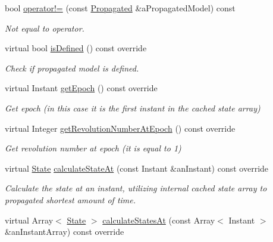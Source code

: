 \begin{DoxyCompactItemize}
bool \hyperlink{classostk_1_1astro_1_1trajectory_1_1orbit_1_1models_1_1_propagated_a71c17288a6039ddcc1a5d3e5e62e1f35}{operator!=} (const \hyperlink{classostk_1_1astro_1_1trajectory_1_1orbit_1_1models_1_1_propagated}{Propagated} \&a\+Propagated\+Model) const
\begin{DoxyCompactList}\small\item\em Not equal to operator. \end{DoxyCompactList}\item 
virtual bool \hyperlink{classostk_1_1astro_1_1trajectory_1_1orbit_1_1models_1_1_propagated_a530fd6bc017c74dedc43ced5fe843a03}{is\+Defined} () const override
\begin{DoxyCompactList}\small\item\em Check if propagated model is defined. \end{DoxyCompactList}\item 
virtual Instant \hyperlink{classostk_1_1astro_1_1trajectory_1_1orbit_1_1models_1_1_propagated_a3bf49ac0824e10057b6abca2cfcc692f}{get\+Epoch} () const override
\begin{DoxyCompactList}\small\item\em Get epoch (in this case it is the first instant in the cached state array) \end{DoxyCompactList}\item 
virtual Integer \hyperlink{classostk_1_1astro_1_1trajectory_1_1orbit_1_1models_1_1_propagated_a789e4236d2b8b212b1d978055b76abf1}{get\+Revolution\+Number\+At\+Epoch} () const override
\begin{DoxyCompactList}\small\item\em Get revolution number at epoch (it is equal to 1) \end{DoxyCompactList}\item 
virtual \hyperlink{classostk_1_1astro_1_1trajectory_1_1_state}{State} \hyperlink{classostk_1_1astro_1_1trajectory_1_1orbit_1_1models_1_1_propagated_a2efc3c1af735dcf2ec622d056fa0a13f}{calculate\+State\+At} (const Instant \&an\+Instant) const override
\begin{DoxyCompactList}\small\item\em Calculate the state at an instant, utilizing internal cached state array to propagated shortest amount of time. \end{DoxyCompactList}\item 
virtual Array$<$ \hyperlink{classostk_1_1astro_1_1trajectory_1_1_state}{State} $>$ \hyperlink{classostk_1_1astro_1_1trajectory_1_1orbit_1_1models_1_1_propagated_a9a4097432d2c863aedead23d2d67a7a7}{calculate\+States\+At} (const Array$<$ Instant $>$ \&an\+Instant\+Array) const override

\end{DoxyCompactItemize}
